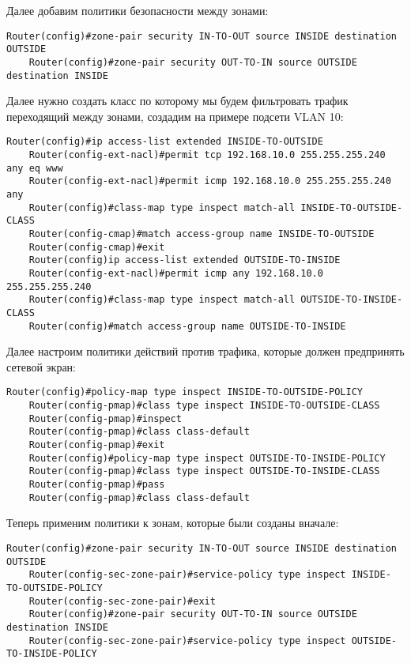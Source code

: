 Далее добавим политики безопасности между зонами:

\begin{lstlisting}[xleftmargin=-2.5em]
    Router(config)#zone-pair security IN-TO-OUT source INSIDE destination OUTSIDE
    Router(config)#zone-pair security OUT-TO-IN source OUTSIDE destination INSIDE
\end{lstlisting}

Далее нужно создать класс по которому мы будем фильтровать трафик переходящий между зонами, создадим на примере подсети VLAN 10:

\begin{lstlisting}[xleftmargin=-2.5em]
    Router(config)#ip access-list extended INSIDE-TO-OUTSIDE
    Router(config-ext-nacl)#permit tcp 192.168.10.0 255.255.255.240 any eq www
    Router(config-ext-nacl)#permit icmp 192.168.10.0 255.255.255.240 any
    Router(config)#class-map type inspect match-all INSIDE-TO-OUTSIDE-CLASS
    Router(config-cmap)#match access-group name INSIDE-TO-OUTSIDE
    Router(config-cmap)#exit
    Router(config)ip access-list extended OUTSIDE-TO-INSIDE
    Router(config-ext-nacl)#permit icmp any 192.168.10.0 255.255.255.240
    Router(config)#class-map type inspect match-all OUTSIDE-TO-INSIDE-CLASS
    Router(config)#match access-group name OUTSIDE-TO-INSIDE
\end{lstlisting}

Далее настроим политики действий против трафика, которые должен предпринять сетевой экран:

\begin{lstlisting}[xleftmargin=-2.5em]
    Router(config)#policy-map type inspect INSIDE-TO-OUTSIDE-POLICY
    Router(config-pmap)#class type inspect INSIDE-TO-OUTSIDE-CLASS
    Router(config-pmap)#inspect
    Router(config-pmap)#class class-default
    Router(config-pmap)#exit
    Router(config)#policy-map type inspect OUTSIDE-TO-INSIDE-POLICY
    Router(config-pmap)#class type inspect OUTSIDE-TO-INSIDE-CLASS
    Router(config-pmap)#pass
    Router(config-pmap)#class class-default
\end{lstlisting}

Теперь применим политики к зонам, которые были созданы вначале:

\begin{lstlisting}[xleftmargin=-2.5em]
    Router(config)#zone-pair security IN-TO-OUT source INSIDE destination OUTSIDE
    Router(config-sec-zone-pair)#service-policy type inspect INSIDE-TO-OUTSIDE-POLICY
    Router(config-sec-zone-pair)#exit
    Router(config)#zone-pair security OUT-TO-IN source OUTSIDE destination INSIDE
    Router(config-sec-zone-pair)#service-policy type inspect OUTSIDE-TO-INSIDE-POLICY
\end{lstlisting}

